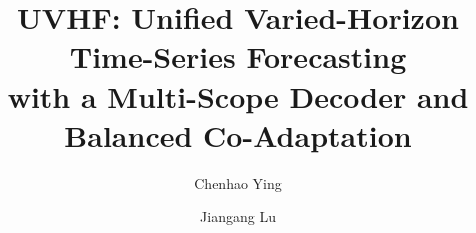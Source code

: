 \documentclass[final,3p,times]{elsarticle}
\newif\ifshowrevisions
\newcommand{\rev}[1]{\ifshowrevisions\textcolor{revisionblue}{#1}\else#1\fi}
\begin{document}
\begin{frontmatter}



\title{\rev{UVHF: Unified Varied-Horizon Time-Series Forecasting}\\
\rev{with a Multi-Scope Decoder and Balanced Co-Adaptation}}


\author{Chenhao Ying}
\author{Jiangang Lu}
\address{{State Key Laboratory of Industrial Control Technology, College of Control Science and Engineering, Zhejiang University},
            {Hangzhou},
            {310027},
            {Zhejiang},
            {China}}





\end{frontmatter}
\end{document}
